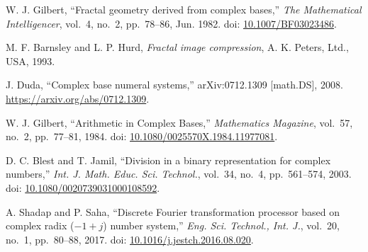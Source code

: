 \documentclass[10pt,a4paper,notitlepage]{report}
\begin{document}
\begin{thebibliography}{0}
W. J. Gilbert,
``Fractal geometry derived from complex bases,''
\textit{The Mathematical Intelligencer},
vol.~4, no.~2, pp.~78--86, Jun. 1982.
doi: \href{https://doi.org/10.1007/BF03023486}{10.1007/BF03023486}.

M. F. Barnsley and L. P. Hurd,
\textit{Fractal image compression},
A. K. Peters, Ltd., USA, 1993.

J. Duda,
``Complex base numeral systems,''
arXiv:0712.1309 [math.DS], 2008.
\url{https://arxiv.org/abs/0712.1309}.

W. J. Gilbert,
``Arithmetic in Complex Bases,''
\textit{Mathematics Magazine},
vol.~57, no.~2, pp.~77--81, 1984.
doi: \href{https://doi.org/10.1080/0025570X.1984.11977081}{10.1080/0025570X.1984.11977081}.

D. C. Blest and T. Jamil,
``Division in a binary representation for complex numbers,''
\textit{Int. J. Math. Educ. Sci. Technol.},
vol.~34, no.~4, pp.~561--574, 2003.
doi: \href{https://doi.org/10.1080/0020739031000108592}{10.1080/0020739031000108592}.

A. Shadap and P. Saha,
``Discrete Fourier transformation processor based on complex radix ($-1+j$) number system,''
\textit{Eng. Sci. Technol., Int. J.},
vol.~20, no.~1, pp.~80--88, 2017.
doi: \href{https://doi.org/10.1016/j.jestch.2016.08.020}{10.1016/j.jestch.2016.08.020}.

\end{thebibliography}
\end{document}
